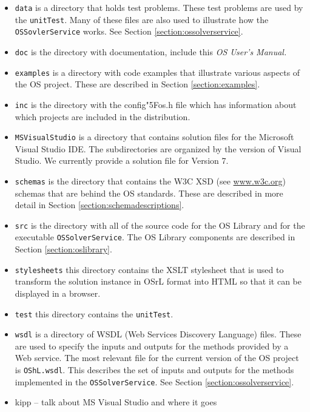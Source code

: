 \documentclass[11pt]{article}
\renewcommand{\_}{{\char"5F}}
\renewcommand{\{}{{\char"7B}}
\renewcommand{\}}{{\char"7D}}
\renewcommand{\^}{{\char"0D}}
\renewcommand{\'}{{\char"0D}}
\begin{document}
\begin{itemize}

\item {\tt data} is a directory that holds test problems. These test problems are used by the {\tt unitTest}. Many of these files are also used to illustrate how the {\tt OSSovlerService} works. See Section \ref{section:ossolverservice}.

\item {\tt doc} is the directory with documentation, include this {\it OS User's Manual.}

\item {\tt examples} is a directory with code examples that illustrate various aspects of the OS project.    These are described in Section \ref{section:examples}.

\item {\tt inc} is the directory with the config\_os.h file which has information about which projects are included in the distribution.


\item {\tt MSVisualStudio} is a directory that  contains solution files for the Microsoft Visual Studio IDE.  The subdirectories are organized by the version of Visual Studio. We currently provide a solution file for Version 7.

\item {\tt schemas} is the directory that contains the W3C XSD (see \url{www.w3c.org}) schemas that are behind the OS standards. These are described in more detail in Section \ref{section:schemadescriptions}.

\item {\tt src} is the directory with all of the source code for the OS Library and for the executable {\tt OSSolverService}. The OS Library components are described in Section \ref{section:oslibrary}.

\item {\tt stylesheets} this directory contains the XSLT stylesheet that is used to transform the solution instance in OSrL format into HTML so that it can be displayed in a browser.

\item {\tt test} this directory contains the {\tt unitTest}.


\item  {\tt wsdl} is a directory of WSDL (Web Services Discovery Language) files. These are used to specify the inputs and outputs for the methods provided by a Web service. The most relevant file for the current version of the OS project is {\tt OShL.wsdl}.  This describes the set of inputs and outputs for the methods implemented in the {\tt OSSolverService}. See Section \ref{section:ossolverservice}.


\item kipp -- talk about MS Visual Studio and where it goes
\end{itemize}
\end{document}
